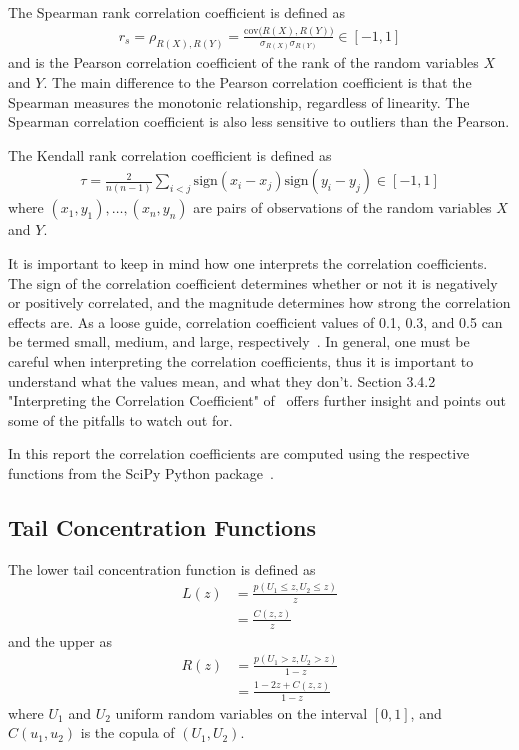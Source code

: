 The Spearman rank correlation coefficient is defined as
\begin{align}
    r_s = \rho_{R(X),R(Y)} = \frac{\text{cov}{\big(R(X),R(Y)\big)}}{\sigma_{R(X)} \sigma_{R(Y)}} \in [-1, 1]
\end{align}
and is the Pearson correlation coefficient of the rank of the random variables \( X \) and \( Y \).
The main difference to the Pearson correlation coefficient is that the Spearman measures the monotonic relationship, regardless of linearity.
The Spearman correlation coefficient is also less sensitive to outliers than the Pearson.

The Kendall rank correlation coefficient is defined as
\begin{align}
    \tau = \frac{2}{n(n-1)} \sum_{i<j} \text{sign}(x_i - x_j) \text{sign}(y_i - y_j) \in [-1, 1]
\end{align}
where \( (x_1, y_1), \dots, (x_n, y_n) \) are pairs of observations of the random variables \( X \) and \( Y \).

It is important to keep in mind how one interprets the correlation coefficients.
The sign of the correlation coefficient determines whether or not it is negatively or positively correlated, and the magnitude determines how strong the correlation effects are.
As a loose guide, correlation coefficient values of 0.1, 0.3, and 0.5 can be termed small, medium, and large, respectively~\cite{research_design_and_statistical_analysis}.
In general, one must be careful when interpreting the correlation coefficients, thus it is important to understand what the values mean, and what they don't.
Section 3.4.2 "Interpreting the Correlation Coefficient" of~\cite{research_design_and_statistical_analysis} offers further insight and points out some of the pitfalls to watch out for.

In this report the correlation coefficients are computed using the respective functions from the SciPy Python package~\cite{python_scipy}.

\subsection{Tail Concentration Functions}\label{app:tail_concentration_functions}
The lower tail concentration function is defined as~\cite{venter_2002}
\begin{align}
    L(z)
        &= \frac{p(U_1 \le z, U_2 \le z)}{z} \\
        &= \frac{C(z,z)}{z}
\end{align}
and the upper as
\begin{align}
    R(z)
        &= \frac{p(U_1 > z, U_2 > z)}{1-z} \\
        &= \frac{1 - 2z + C(z,z)}{1-z}
\end{align}
where \( U_1 \) and \( U_2 \) uniform random variables on the interval \( [0, 1] \), and \( C(u_1, u_2) \) is the copula of \( (U_1, U_2) \).

